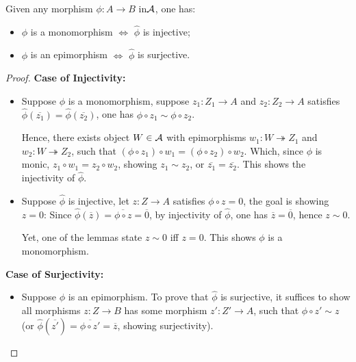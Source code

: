 \documentclass{article}
\begin{document}
\begin{lem}
    Given any morphism $\phi:A\rightarrow B$ in$\cal{A}$, one has:
    \begin{itemize}
        \item $\phi$ is a monomorphism $\iff$ $\hat{\phi}$ is injective;
        \item $\phi$ is an epimorphism $\iff$ $\hat{\phi}$ is surjective.
    \end{itemize}
\end{lem}
\begin{proof}
    \textbf{Case of Injectivity:}

    \begin{itemize}
        \item[$\implies$:] Suppose $\phi$ is a monomorphism, suppose $z_1:Z_1\rightarrow A$ and $z_2:Z_2\rightarrow A$ satisfies $\hat{\phi}(\overline{z_1})=\hat{\phi}(\overline{z_2})$, one has $\phi\circ z_1\sim \phi\circ z_2$.
        
        Hence, there exists object $W\in\cal{A}$ with epimorphisms $w_1:W\twoheadrightarrow Z_1$ and $w_2:W\twoheadrightarrow Z_2$, such that $(\phi\circ z_1)\circ w_1=(\phi\circ z_2)\circ w_2$. Which, since $\phi$ is monic, $z_1\circ w_1=z_2\circ w_2$, showing $z_1\sim z_2$, or $\overline{z_1}=\overline{z_2}$. This shows the injectivity of $\hat{\phi}$.
        \item[$\impliedby$:] Suppose $\hat{\phi}$ is injective, let $z:Z\rightarrow A$ satisfies $\phi\circ z=0$, the goal is showing $z=0$: Since $\hat{\phi}(\overline{z}) = \overline{\phi\circ z}=\overline{0}$, by injectivity of $\hat{\phi}$, one has $\overline{z}=\overline{0}$, hence $z\sim 0$.
        
        Yet, one of the lemmas state $z\sim 0$ iff $z=0$. This shows $\phi$ is a monomorphism.
    \end{itemize}

    \hfil

    \textbf{Case of Surjectivity:}
    \begin{itemize}
        \item[$\implies$:] Suppose $\phi$ is an epimorphism. To prove that $\hat{\phi}$ is surjective, it suffices to show all morphisms $z:Z\rightarrow B$ has some morphism $z':Z'\rightarrow A$, such that $\phi\circ z'\sim z$ (or $\hat{\phi}(\overline{z'}) = \overline{\phi\circ z'}=\overline{z}$, showing surjectivity).
        

\end{itemize}
\end{proof}
\end{document}
